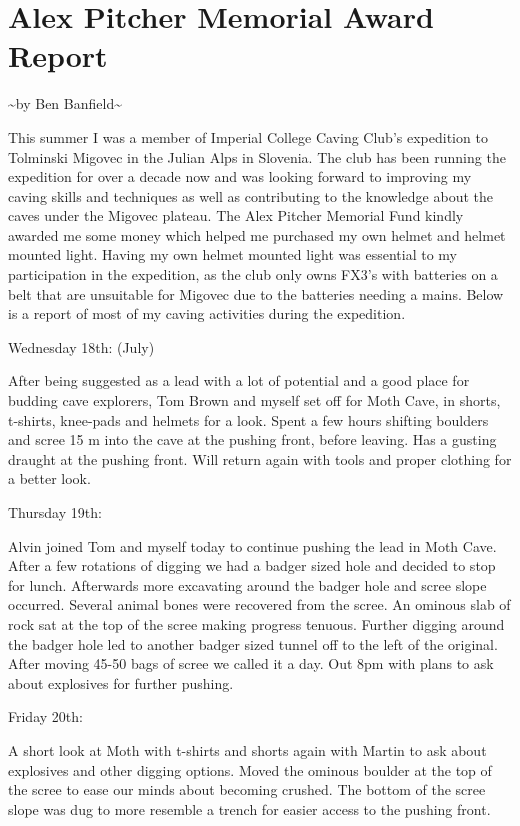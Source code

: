 \section{Alex Pitcher Memorial Award Report}

\textasciitilde{}by Ben Banfield\textasciitilde{}

This summer I was a member of Imperial College Caving Club's expedition
to Tolminski Migovec in the Julian Alps in Slovenia. The club has been
running the expedition for over a decade now and was looking forward to
improving my caving skills and techniques as well as contributing to the
knowledge about the caves under the Migovec plateau. The Alex Pitcher
Memorial Fund kindly awarded me some money which helped me purchased my
own helmet and helmet mounted light. Having my own helmet mounted light
was essential to my participation in the expedition, as the club only
owns FX3's with batteries on a belt that are unsuitable for Migovec due
to the batteries needing a mains. Below is a report of most of my caving
activities during the expedition.

Wednesday 18th: (July)

After being suggested as a lead with a lot of potential and a good place
for budding cave explorers, Tom Brown and myself set off for Moth Cave,
in shorts, t-shirts, knee-pads and helmets for a look. Spent a few hours
shifting boulders and scree 15 m into the cave at the pushing front,
before leaving. Has a gusting draught at the pushing front. Will return
again with tools and proper clothing for a better look.

Thursday 19th:

Alvin joined Tom and myself today to continue pushing the lead in Moth
Cave. After a few rotations of digging we had a badger sized hole and
decided to stop for lunch. Afterwards more excavating around the badger
hole and scree slope occurred. Several animal bones were recovered from
the scree. An ominous slab of rock sat at the top of the scree making
progress tenuous. Further digging around the badger hole led to another
badger sized tunnel off to the left of the original. After moving 45-50
bags of scree we called it a day. Out 8pm with plans to ask about
explosives for further pushing.

Friday 20th:

A short look at Moth with t-shirts and shorts again with Martin to ask
about explosives and other digging options. Moved the ominous boulder at
the top of the scree to ease our minds about becoming crushed. The
bottom of the scree slope was dug to more resemble a trench for easier
access to the pushing front.


